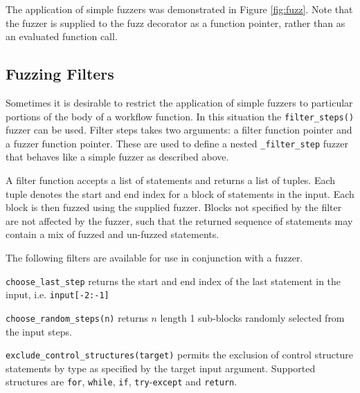 \documentclass{sig-alternate}
\newenvironment{FunctionList}{%
\lstset{basicstyle=\ttfamily\bfseries\small}
\begin{list}{}{\leftmargin=5pt}
}{\end{list}\lstset{basicstyle=\ttfamily\small}}
\begin{document}
The application of simple fuzzers was demonstrated in Figure \ref{fig:fuzz}.
Note that the fuzzer is supplied to the fuzz decorator as a function pointer,
rather than as an evaluated function call.


\subsection{Fuzzing Filters}


Sometimes it is desirable to restrict the application of simple fuzzers to
particular portions of the body of a workflow function.  In this situation the
\lstinline!filter_steps()! fuzzer can be used.  Filter steps takes two
arguments: a filter function pointer and a fuzzer function pointer.  These are
used to define a nested \lstinline!_filter_step! fuzzer that behaves like a
simple fuzzer as described above.

A filter function accepts a list of statements and returns a list of tuples.
Each tuple denotes the start and end index for a block of statements in the
input.  Each block is then fuzzed using the supplied fuzzer.  Blocks not
specified by the filter are not affected by the fuzzer, such that the returned
sequence of statements may contain a mix of fuzzed and un-fuzzed statements.

The following filters are available for use in conjunction with a fuzzer.

\begin{FunctionList}

\item \lstinline!choose_last_step! returns the start and end index of the last
  statement in the input, i.e. \lstinline!input[-2:-1]!

\item \lstinline!choose_random_steps(n)!  returns $n$ length 1 sub-blocks
  randomly selected from the input steps.

\item \lstinline!exclude_control_structures(target)! permits the exclusion of
  control structure statements by type as specified by the target input
  argument. Supported structures are \lstinline!for!, \lstinline!while!,
  \lstinline!if!, \lstinline!try!-\lstinline!except! and \lstinline!return!.

\end{FunctionList}
\end{document}
